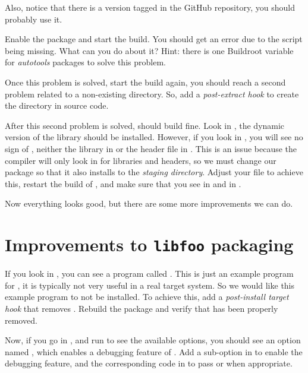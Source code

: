 Also, notice that there is a version tagged  in the GitHub
repository, you should probably use it.

Enable the  package and start the build. You should get
an error due to the  script being missing. What can
you do about it? Hint: there is one Buildroot variable for {\em
autotools} packages to solve this problem.

Once this problem is solved, start the build again, you should reach a
second problem related to a non-existing  directory. So, add
a {\em post-extract hook} to create the  directory in
 source code.

After this second problem is solved,  should build
fine. Look in , the dynamic version of the
library should be installed. However, if you look in
, you will see no sign of , neither
the library in  or the header file in
. This is an issue because the
compiler will only look in  for libraries and
headers, so we must change our package so that it also installs to the
{\em staging directory}. Adjust your  file to achieve
this, restart the build of , and make sure that you see
 in  and 
in .

Now everything looks good, but there are some more improvements we can
do.

\section{Improvements to {\tt libfoo} packaging}

If you look in , you can see a program
called . This is just an example program for
, it is typically not very useful in a real target
system. So we would like this example program to not be installed. To
achieve this, add a {\em post-install target hook} that removes
. Rebuild the  package and verify
that  has been properly removed.

Now, if you go in , and run
 to see the available options, you should see
an option named , which enables a
debugging feature of . Add a sub-option in
 to enable the debugging feature, and
the corresponding code in  to pass
 or  when
appropriate.

